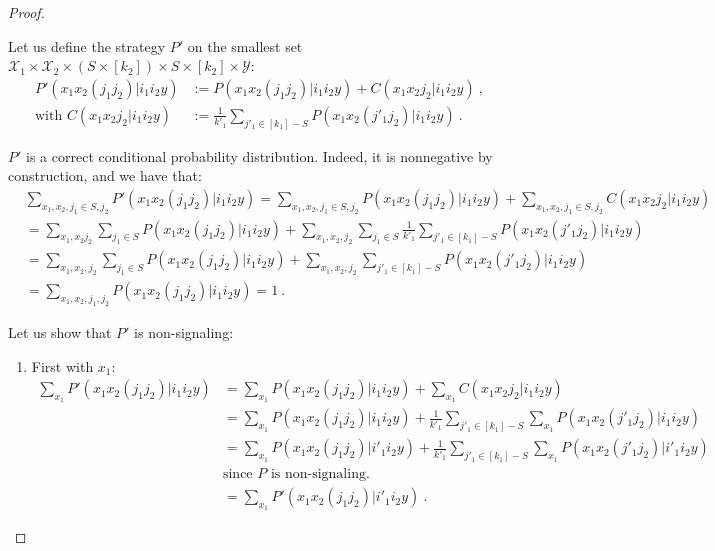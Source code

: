 \documentclass[11pt]{article}
\theoremstyle{definition}
\theoremstyle{remark}
\begin{document}
\begin{proof}
\begin{enumerate}
    Let us define the strategy $P'$ on the smallest set $\mathcal{X}_1\times\mathcal{X}_2\times\left(S \times [k_2]\right)\times S \times [k_2] \times \mathcal{Y}$:
    \begin{equation}
      \begin{aligned}
        P'(x_1x_2(j_1j_2)|i_1i_2y) &:= P(x_1x_2(j_1j_2)|i_1i_2y) + C(x_1x_2j_2|i_1i_2y) \ ,\\
        \text{with } C(x_1x_2j_2|i_1i_2y) &:= \frac{1}{k'_1}\sum_{j'_1 \in [k_1]-S}P(x_1x_2(j'_1j_2)|i_1i_2y) \ .
      \end{aligned}
    \end{equation}

    $P'$ is a correct conditional probability distribution. Indeed, it is nonnegative by construction, and we have that:
    \begin{equation}
      \begin{aligned}
      &\sum_{x_1,x_2,j_1 \in S,j_2} P'(x_1x_2(j_1j_2)|i_1i_2y) = \sum_{x_1,x_2,j_1 \in S,j_2} P(x_1x_2(j_1j_2)|i_1i_2y) + \sum_{x_1,x_2,j_1 \in S,j_2} C(x_1x_2j_2|i_1i_2y)\\
      &= \sum_{x_1,x_2j_2} \sum_{j_1 \in S} P(x_1x_2(j_1j_2)|i_1i_2y) + \sum_{x_1,x_2,j_2}\sum_{j_1 \in S} \frac{1}{k'_1}\sum_{j'_1 \in [k_1]-S}P(x_1x_2(j'_1j_2)|i_1i_2y)\\
        &= \sum_{x_1,x_2,j_2}\sum_{j_1 \in S} P(x_1x_2(j_1j_2)|i_1i_2y) + \sum_{x_1,x_2,j_2} \sum_{j'_1 \in [k_1]-S}P(x_1x_2(j'_1j_2)|i_1i_2y)\\
      &= \sum_{x_1,x_2,j_1,j_2} P(x_1x_2(j_1j_2)|i_1i_2y) = 1 \ .
      \end{aligned}
    \end{equation}
    
    Let us show that $P'$ is non-signaling:
    \begin{enumerate}
    \item First with $x_1$:
    \begin{equation}
      \begin{aligned}
      \sum_{x_1} P'(x_1x_2(j_1j_2)|i_1i_2y) &= \sum_{x_1} P(x_1x_2(j_1j_2)|i_1i_2y) + \sum_{x_1} C(x_1x_2j_2|i_1i_2y)\\
      &= \sum_{x_1} P(x_1x_2(j_1j_2)|i_1i_2y) + \frac{1}{k'_1}\sum_{j'_1 \in [k_1]-S}\sum_{x_1}P(x_1x_2(j'_1j_2)|i_1i_2y)\\
      &= \sum_{x_1} P(x_1x_2(j_1j_2)|i'_1i_2y) + \frac{1}{k'_1}\sum_{j'_1 \in [k_1]-S}\sum_{x_1}P(x_1x_2(j'_1j_2)|i'_1i_2y)\\
      &\text{since $P$ is non-signaling.}\\
      &= \sum_{x_1} P'(x_1x_2(j_1j_2)|i'_1i_2y) \ .
      \end{aligned}
    \end{equation}
    

\end{enumerate}
\end{enumerate}
\end{proof}
\end{document}
